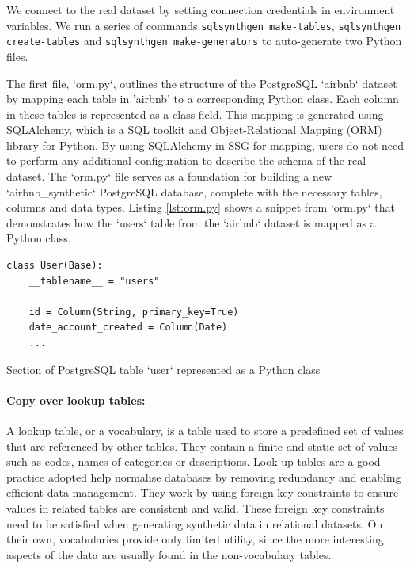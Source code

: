 \documentclass[11pt]{article}
\begin{document}
We connect to the real dataset by setting connection credentials in environment variables. We run a series of commands \texttt{sqlsynthgen make-tables}, \texttt{sqlsynthgen create-tables} and \texttt{sqlsynthgen make-generators} to auto-generate two Python files. 

The first file, `orm.py`, outlines the structure of the PostgreSQL `airbnb` dataset by mapping each table in 'airbnb' to a corresponding Python class. Each column in these tables is represented as a class field. This mapping is generated using SQLAlchemy\cite{sqlalchemy}, which is a SQL toolkit and Object-Relational Mapping (ORM) library for Python. By using SQLAlchemy in SSG for mapping, users do not need to perform any additional configuration to describe the schema of the real dataset. The `orm.py` file serves as a foundation for building a new `airbnb\_synthetic` PostgreSQL database, complete with the necessary tables, columns and data types. Listing \ref{lst:orm.py} shows a snippet from `orm.py` that demonstrates how the  `users` table from the `airbnb`  dataset is mapped as a Python class.

\begin{listing}[H]
\begin{verbatim}
class User(Base):
    __tablename__ = "users"

    id = Column(String, primary_key=True)
    date_account_created = Column(Date)
    ...
\end{verbatim}
\caption{Section of PostgreSQL table `user` represented as a Python class}
\label{lst:orm.py}
\end{listing}

\paragraph{Copy over lookup tables: }

A lookup table, or a vocabulary, is a table used to store a predefined set of values that are referenced by other tables. They contain a finite and static set of values such as codes, names of categories or descriptions. Look-up tables are a good practice adopted help normalise databases by removing redundancy and enabling efficient data management. They work by using foreign key constraints to ensure values in related tables are consistent and valid. These foreign key constraints need to be satisfied when generating synthetic data in relational datasets. On their own, vocabularies provide only limited utility, since the more interesting aspects of the data are usually found in the non-vocabulary tables. 
\end{document}
